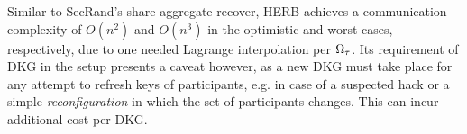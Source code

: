 

Similar to SecRand's share-aggregate-recover, HERB achieves a communication complexity of $O(n^2)$ and $O(n^3)$ in the optimistic and worst cases, respectively, due to one needed Lagrange interpolation per $\Omega_\tau$. Its requirement of DKG in the setup presents a caveat however, as a new DKG must take place for any attempt to refresh keys of participants, e.g. in case of a suspected hack or a simple \textit{reconfiguration} in which the set of participants changes. This can incur additional cost per DKG.
